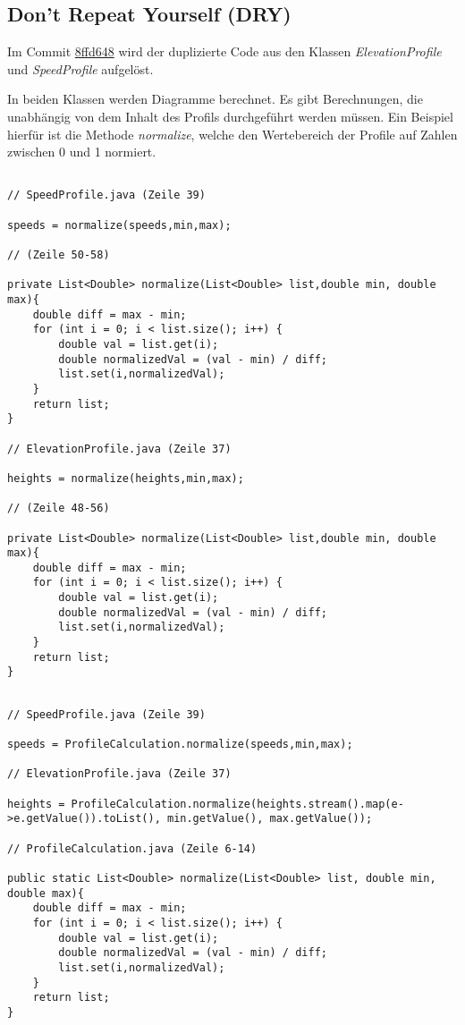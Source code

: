 \subsection{Don’t Repeat Yourself (DRY)}

Im Commit \href{https://github.com/reichert-p/GPXrechner/commit/8ffd648d794563fea2c8662debe12ca1277b1b3e#diff-3be7b5bf425b2c9794272cdc879a4e9b0ed23bab55acbdf71756fbda1356ff80}{8ffd648} wird der duplizierte Code aus den Klassen \textit{ElevationProfile} und \textit{SpeedProfile} aufgelöst.

In beiden Klassen werden Diagramme berechnet. Es gibt Berechnungen, die unabhängig von dem Inhalt des Profils durchgeführt werden müssen. Ein Beispiel hierfür ist die Methode \textit{normalize}, welche den Wertebereich der Profile auf Zahlen zwischen 0 und 1 normiert.


\begin{lstlisting}[caption={Sich wiederholender Code vor dem Commit}]

// SpeedProfile.java (Zeile 39)

speeds = normalize(speeds,min,max);
		
// (Zeile 50-58)

private List<Double> normalize(List<Double> list,double min, double max){
	double diff = max - min;
	for (int i = 0; i < list.size(); i++) {
		double val = list.get(i);
		double normalizedVal = (val - min) / diff;
		list.set(i,normalizedVal);
	}
	return list;
}   

// ElevationProfile.java (Zeile 37)

heights = normalize(heights,min,max);
		
// (Zeile 48-56)

private List<Double> normalize(List<Double> list,double min, double max){
	double diff = max - min;
	for (int i = 0; i < list.size(); i++) {
		double val = list.get(i);
		double normalizedVal = (val - min) / diff;
		list.set(i,normalizedVal);
	}
	return list;
}

\end{lstlisting}


\begin{lstlisting}[caption={Angewandtes DRY-Prinzip nach dem Commit}]

// SpeedProfile.java (Zeile 39)

speeds = ProfileCalculation.normalize(speeds,min,max);
				
// ElevationProfile.java (Zeile 37)

heights = ProfileCalculation.normalize(heights.stream().map(e->e.getValue()).toList(), min.getValue(), max.getValue());

// ProfileCalculation.java (Zeile 6-14)

public static List<Double> normalize(List<Double> list, double min, double max){
	double diff = max - min;
	for (int i = 0; i < list.size(); i++) {
		double val = list.get(i);
		double normalizedVal = (val - min) / diff;
		list.set(i,normalizedVal);
	}
	return list;
}

\end{lstlisting}